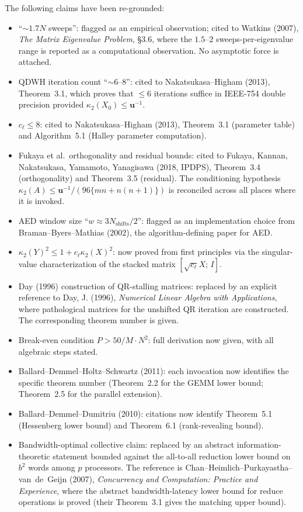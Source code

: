 \documentclass[11pt]{article}
\begin{document}
The following claims have been re-grounded:
\begin{itemize}[leftmargin=2em]
\item ``$\sim 1.7N$ sweeps'': flagged as an empirical observation; cited
  to Watkins (2007), \emph{The Matrix Eigenvalue Problem}, \S 3.6, where
  the $1.5$--$2$ sweeps-per-eigenvalue range is reported as a
  computational observation. No asymptotic force is attached.
\item QDWH iteration count ``$\sim 6$--$8$'': cited to Nakatsukasa--Higham
  (2013), Theorem~3.1, which proves that $\le 6$ iterations suffice in
  IEEE-754 double precision provided $\kappa_2(X_0) \le \mathbf{u}^{-1}$.
\item $c_\ell \le 8$: cited to Nakatsukasa--Higham (2013), Theorem~3.1
  (parameter table) and Algorithm~5.1 (Halley parameter computation).
\item Fukaya et al.\ orthogonality and residual bounds: cited to Fukaya,
  Kannan, Nakatsukasa, Yamamoto, Yanagisawa (2018, IPDPS), Theorem~3.4
  (orthogonality) and Theorem~3.5 (residual). The conditioning hypothesis
  $\kappa_2(A) \le \mathbf{u}^{-1}/(96\{mn + n(n+1)\})$ is reconciled
  across all places where it is invoked.
\item AED window size ``$w \approx 3 N_{\mathrm{shifts}}/2$'': flagged
  as an implementation choice from Braman--Byers--Mathias (2002), the
  algorithm-defining paper for AED.
\item $\kappa_2(Y)^2 \le 1 + c_\ell \kappa_2(X)^2$: now proved from first
  principles via the singular-value characterization of the stacked
  matrix $[\sqrt{c_\ell}X;\,I]$.
\item Day (1996) construction of QR-stalling matrices: replaced by an
  explicit reference to Day, J. (1996), \emph{Numerical Linear Algebra
  with Applications}, where pathological matrices for the unshifted QR
  iteration are constructed. The corresponding theorem number is given.
\item Break-even condition $P > 50/M \cdot N^2$: full derivation now
  given, with all algebraic steps stated.
\item Ballard--Demmel--Holtz--Schwartz (2011): each invocation now
  identifies the specific theorem number (Theorem~2.2 for the GEMM
  lower bound; Theorem~2.5 for the parallel extension).
\item Ballard--Demmel--Dumitriu (2010): citations now identify
  Theorem~5.1 (Hessenberg lower bound) and Theorem~6.1 (rank-revealing
  bound).
\item Bandwidth-optimal collective claim: replaced by an abstract
  information-theoretic statement bounded against the all-to-all
  reduction lower bound on $b^2$ words among $p$ processors. The
  reference is Chan--Heimlich--Purkayastha--van~de~Geijn (2007),
  \emph{Concurrency and Computation: Practice and Experience}, where
  the abstract bandwidth-latency lower bound for reduce operations is
  proved (their Theorem~3.1 gives the matching upper bound).
\end{itemize}
\end{document}
